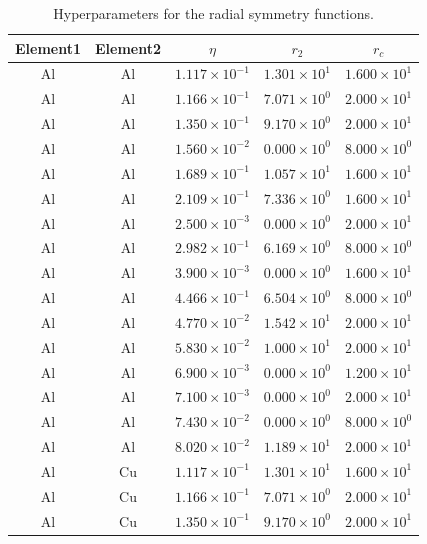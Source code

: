 \documentclass{article}
\renewcommand{\arraystretch}{1.5}
\begin{document}
\bgroup
\def\arraystretch{1.2}
\begin{longtable}{ccccc}
\caption{Hyperparameters for the radial symmetry functions.} \\
\hline
Element1 & Element2 & $\eta$ & $r_2$ & $r_c$ \\
\hline
\hline
Al &  Al & $1.117 \times 10^{-1}$ & $1.301 \times 10^{1}$ & $1.600 \times 10^{1}$ \\
Al &  Al & $1.166 \times 10^{-1}$ & $7.071 \times 10^{0}$ & $2.000 \times 10^{1}$ \\
Al &  Al & $1.350 \times 10^{-1}$ & $9.170 \times 10^{0}$ & $2.000 \times 10^{1}$ \\
Al &  Al & $1.560 \times 10^{-2}$ & $0.000 \times 10^{0}$ & $8.000 \times 10^{0}$ \\
Al &  Al & $1.689 \times 10^{-1}$ & $1.057 \times 10^{1}$ & $1.600 \times 10^{1}$ \\
Al &  Al & $2.109 \times 10^{-1}$ & $7.336 \times 10^{0}$ & $1.600 \times 10^{1}$ \\
Al &  Al & $2.500 \times 10^{-3}$ & $0.000 \times 10^{0}$ & $2.000 \times 10^{1}$ \\
Al &  Al & $2.982 \times 10^{-1}$ & $6.169 \times 10^{0}$ & $8.000 \times 10^{0}$ \\
Al &  Al & $3.900 \times 10^{-3}$ & $0.000 \times 10^{0}$ & $1.600 \times 10^{1}$ \\
Al &  Al & $4.466 \times 10^{-1}$ & $6.504 \times 10^{0}$ & $8.000 \times 10^{0}$ \\
Al &  Al & $4.770 \times 10^{-2}$ & $1.542 \times 10^{1}$ & $2.000 \times 10^{1}$ \\
Al &  Al & $5.830 \times 10^{-2}$ & $1.000 \times 10^{1}$ & $2.000 \times 10^{1}$ \\
Al &  Al & $6.900 \times 10^{-3}$ & $0.000 \times 10^{0}$ & $1.200 \times 10^{1}$ \\
Al &  Al & $7.100 \times 10^{-3}$ & $0.000 \times 10^{0}$ & $2.000 \times 10^{1}$ \\
Al &  Al & $7.430 \times 10^{-2}$ & $0.000 \times 10^{0}$ & $8.000 \times 10^{0}$ \\
Al &  Al & $8.020 \times 10^{-2}$ & $1.189 \times 10^{1}$ & $2.000 \times 10^{1}$ \\
Al &  Cu & $1.117 \times 10^{-1}$ & $1.301 \times 10^{1}$ & $1.600 \times 10^{1}$ \\
Al &  Cu & $1.166 \times 10^{-1}$ & $7.071 \times 10^{0}$ & $2.000 \times 10^{1}$ \\
Al &  Cu & $1.350 \times 10^{-1}$ & $9.170 \times 10^{0}$ & $2.000 \times 10^{1}$ \\

\end{longtable}
\end{document}
